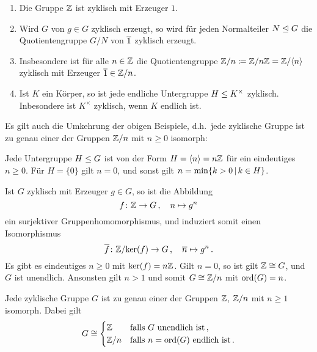 \begin{example}
  \begin{enumerate}
    \item
      Die Gruppe $\mathbb{Z}$ ist zyklisch mit Erzeuger $1$.
    \item
      Wird $G$ von $g \in G$ zyklisch erzeugt, so wird für jeden Normalteiler $N \mathrel{\trianglelefteq} G$ die Quotientengruppe $G/N$ von $\overline{1}$ zyklisch erzeugt.
    \item
      Insbesondere ist für alle $n \in \mathbb{Z}$ die Quotientengruppe $\mathbb{Z}/n \coloneqq \mathbb{Z}/n\mathbb{Z} = \mathbb{Z}/\langle n\rangle$ zyklisch mit Erzeuger $\overline{1} \in \mathbb{Z}/n$.
    \item
      Ist $K$ ein Körper, so ist jede endliche Untergruppe $H \mathrel{\leq} K^\times$ zyklisch.
      Inbesondere ist $K^\times$ zyklisch, wenn $K$ endlich ist.
  \end{enumerate}
\end{example}

Es gilt auch die Umkehrung der obigen Beispiele, d.h.\ jede zyklische Gruppe ist zu genau einer der Gruppen $\mathbb{Z}/n$ mit $n \geq 0$ isomorph:

\begin{lemma}
\label{lemma: subgroups of Z}
  Jede Untergruppe $H \mathrel{\leq} G$ ist von der Form $H = \langle n\rangle = n\mathbb{Z}$ für ein eindeutiges $n \geq 0$.
  Für $H = \{0\}$ gilt $n = 0$, und sonst gilt $n = \min \{k > 0 \suchthat k \in H\}$.
\end{lemma}

Ist $G$ zyklisch mit Erzeuger $g \in G$, so ist die Abbildung
\[
          f
  \colon  \mathbb{Z}
  \to     G \,,
  \quad   n
  \mapsto g^n
\]
ein surjektiver Gruppenhomomorphismus, und induziert somit einen Isomorphismus
\[
          \overline{f}
  \colon  \mathbb{Z}/{\ker(f)}
  \to     G \,,
  \quad   \overline{n}
  \mapsto g^n \,.
\]
Es gibt es eindeutiges $n \geq 0$ mit $\ker(f) = n\mathbb{Z}$.
Gilt $n = 0$, so ist gilt $\mathbb{Z} \cong G$, und $G$ ist unendlich.
Ansonsten gilt $n > 1$ und somit $G \cong \mathbb{Z}/n$ mit $\operatorname{ord}(G) = n$.

\begin{corollary}
  Jede zyklische Gruppe $G$ ist zu genau einer der Gruppen $\mathbb{Z}$, $\mathbb{Z}/n$ mit $n \geq 1$ isomorph.
  Dabei gilt
  \[
          G
    \cong \begin{cases}
              \mathbb{Z}
            & \text{falls $G$ unendlich ist} \,,
          \\
              \mathbb{Z}/n
            & \text{falls $n = \operatorname{ord}(G)$ endlich ist} \,.
          \end{cases}
  \]
\end{corollary}

